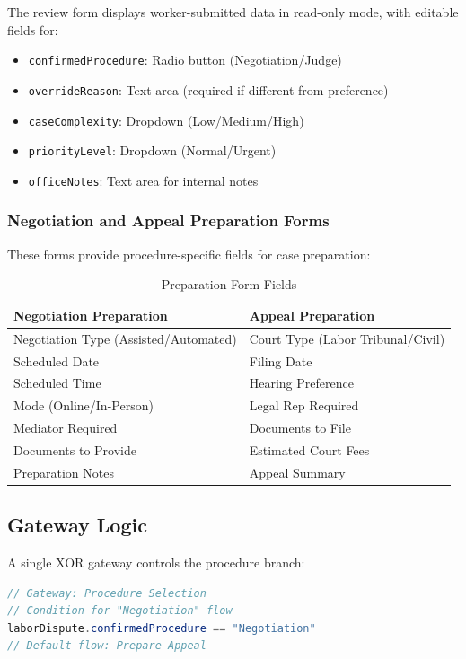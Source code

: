 \documentclass[12pt,a4paper]{article}
\begin{document}
The review form displays worker-submitted data in read-only mode, with editable fields for:
\begin{itemize}
    \item \texttt{confirmedProcedure}: Radio button (Negotiation/Judge)
    \item \texttt{overrideReason}: Text area (required if different from preference)
    \item \texttt{caseComplexity}: Dropdown (Low/Medium/High)
    \item \texttt{priorityLevel}: Dropdown (Normal/Urgent)
    \item \texttt{officeNotes}: Text area for internal notes
\end{itemize}

\subsubsection{Negotiation and Appeal Preparation Forms}

These forms provide procedure-specific fields for case preparation:

\begin{table}[H]
\centering
\caption{Preparation Form Fields}
\begin{tabular}{ll}
\toprule
\textbf{Negotiation Preparation} & \textbf{Appeal Preparation} \\
\midrule
Negotiation Type (Assisted/Automated) & Court Type (Labor Tribunal/Civil) \\
Scheduled Date & Filing Date \\
Scheduled Time & Hearing Preference \\
Mode (Online/In-Person) & Legal Rep Required \\
Mediator Required & Documents to File \\
Documents to Provide & Estimated Court Fees \\
Preparation Notes & Appeal Summary \\
\bottomrule
\end{tabular}
\label{tab:prep_forms}
\end{table}

\subsection{Gateway Logic}

A single XOR gateway controls the procedure branch:

\begin{lstlisting}[language=Java, caption=Contest 3 Gateway Condition (Groovy)]
// Gateway: Procedure Selection
// Condition for "Negotiation" flow
laborDispute.confirmedProcedure == "Negotiation"
// Default flow: Prepare Appeal
\end{lstlisting}
\end{document}

